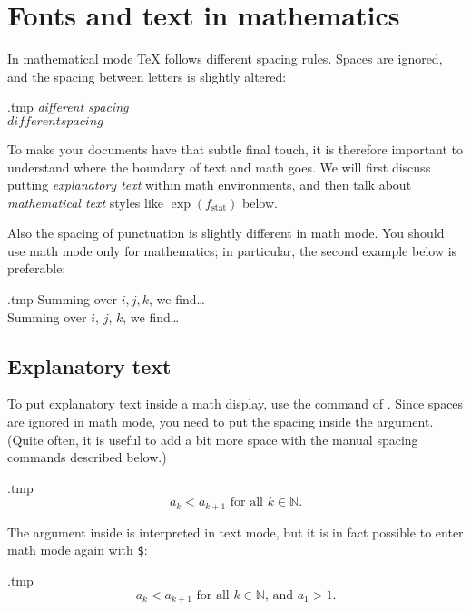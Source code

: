 %
%
%
\section{Fonts and text in mathematics}

In mathematical mode \TeX{} follows different spacing rules.
Spaces are ignored, and the spacing between letters is slightly altered:
%
\begin{VerbatimOut}{\jobname.tmp}
\emph{different spacing}\\
$different spacing$
\end{VerbatimOut}
\ShowExample
%
To make your documents have that subtle final touch,
it is therefore important to understand where the boundary of text and math goes.
We will first discuss putting \emph{explanatory text} within math environments,
and then talk about \emph{mathematical text} styles like $\exp(f_{\mathrm{stat}})$ below.

\begin{practices}
Also the spacing of punctuation is slightly different in math mode.
You should use math mode only for mathematics;
in particular, the second example below is preferable:
%
\begin{VerbatimOut}{\jobname.tmp}
Summing over $i, j, k$, we find\dots\\
Summing over $i$, $j$, $k$, we find\dots\\
\end{VerbatimOut}
\ShowExample
\end{practices}


%
%
\subsection{Explanatory text}

To put explanatory text inside a math display, use the  command of .
Since spaces are ignored in math mode, you need to put the spacing inside the argument.
(Quite often, it is useful to add a bit more space with the manual spacing commands described below.)
%
\begin{VerbatimOut}{\jobname.tmp}
\[
a_k < a_{k+1}
\text{ for all } k \in \mathbb N.
\]
\end{VerbatimOut}
\ShowExample
%
The argument inside  is interpreted in text mode,
but it is in fact possible to enter math mode again with \verb|$|:
%
\begin{VerbatimOut}{\jobname.tmp}
\[
a_k < a_{k+1}
\text{ for all $k \in \mathbb N$, and }
a_1 > 1.
\]
\end{VerbatimOut}
\ShowExampleBelow


